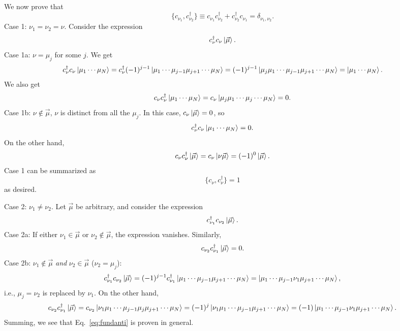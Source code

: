 \documentclass{report}
\theoremstyle{plain}
\theoremstyle{definition}
\begin{document}
We now prove that
\begin{equation}
  \{ c_{\nu_1}, c^\dag_{\nu_2} \} \equiv c_{\nu_1} c^\dag_{\nu_2} +
  c^\dag_{\nu_2} c_{\nu_1} = \delta_{\nu_1,\nu_2}. \label{eq:fundanti}
\end{equation}
Case 1: $\nu_1 = \nu_2 = \nu$. Consider the expression
\begin{equation}
  c^\dag_\nu c_\nu \ket{\vec{\mu}}.
\end{equation}
Case 1a: $\nu = \mu_j$ for some $j$. We get
\begin{equation}
  c^\dag_\nu c_\nu \ket{\mu_1\cdots\mu_N} = c^\dag_\nu (-1)^{j-1}
  \ket{\mu_1\cdots\mu_{j-1}\mu_{j+1}\cdots\mu_N} = (-1)^{j-1}
  \ket{\mu_j\mu_1\cdots\mu_{j-1}\mu_{j+1}\cdots\mu_N} =
  \ket{\mu_1\cdots\mu_N}.
\end{equation}
We also get
\begin{equation}
  c_\nu c^\dag_\nu \ket{\mu_1\cdots \mu_N} = c_\nu
  \ket{\mu_j\mu_1\cdots\mu_j\cdots\mu_N} = 0.
\end{equation}
Case 1b: $\nu \notin \vec{\mu}$, $\nu$ is distinct from all the
$\mu_j$. In this case, $c_\nu\ket{\vec{\mu}} = 0$, so
\begin{equation}
  c^\dag_\nu c_\nu \ket{\mu_1\cdots \mu_N} = 0.
\end{equation}
On the other hand,
\begin{equation}
  c_\nu c^\dag_\nu \ket{\vec{\mu}} = c_\nu \ket{\nu\vec{\mu}} = (-1)^0
  \ket{\vec{\mu}}.
\end{equation}
Case 1 can be summarized as
\begin{equation}
  \{ c_\nu, c^\dag_\nu\} = 1
\end{equation}
as desired.

Case 2: $\nu_1\neq \nu_2$. Let $\vec{\mu}$ be arbitrary, and consider
the expression
\begin{equation}
  c^\dag_{\nu_1} c_{\nu_2} \ket{\vec{\mu}}.
\end{equation}
Case 2a: If either $\nu_1\in\vec{\mu}$ or $\nu_2\notin\vec{\mu}$, the
expression vanishes. Similarly,
\begin{equation}
  c_{\nu_2} c^\dag_{\nu_1} \ket{\vec{\mu}} = 0.
\end{equation}
Case 2b: $\nu_1 \notin \vec{\mu}$ \emph{and} $\nu_2 \in \vec{\mu}$
($\nu_2 = \mu_j$):
\begin{equation}
  c^\dag_{\nu_1} c_{\nu_2} \ket{\vec{\mu}} = (-1)^{j-1} c^\dag_{\nu_1}
  \ket{\mu_1\cdots\mu_{j-1}\mu_{j+1} \cdots\mu_N} =
  \ket{\mu_1\cdots\mu_{j-1}\nu_1\mu_{j+1}\cdots\mu_N},
\end{equation}
i.e., $\mu_j=\nu_2$ is replaced by $\nu_1$. On the other hand,
\begin{equation}
  c_{\nu_2} c^\dag_{\nu_1} \ket{\vec{\mu}} = c_{\nu_2}
  \ket{\nu_1\mu_1\cdots\mu_{j-1}\mu_j\mu_{j+1} \cdots\mu_N} =
  (-1)^j \ket{\nu_1\mu_1\cdots\mu_{j-1}\mu_{j+1}\cdots\mu_N}
  = (-1)\ket{\mu_1\cdots\mu_{j-1}\nu_1\mu_{j+1}\cdots\mu_N}.
\end{equation} 
Summing, we see that Eq.~\eqref{eq:fundanti} is proven in general.
\end{document}
